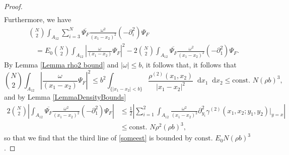 \documentclass[a4paper,11pt]{article}
\newcommand{\abs}[1]{\left\lvert #1 \right\rvert}
\newcommand*\diff{\mathop{}\!\mathrm{d}}
\numberwithin{equation}{section}
\begin{document}
\begin{proof}
\begin{equation}
\begin{aligned}
		\end{aligned}
		\end{equation}
		Furthermore, we have \begin{equation}
		\begin{aligned}
		&\binom{N}{2}\int_{A_{12}}\sum_{i=3}^{N} \overline{\Psi_F}\frac{\omega^2}{(x_1-x_2)^2}(-\partial^2_i)\Psi_F\\&\quad=E_0\binom{N}{2}\int_{A_{12}}\left\lvert\frac{\omega}{(x_1-x_2)}\Psi_F\right\rvert^2-2\binom{N}{2}\int_{A_{12}} \overline{\Psi_F}\frac{\omega^2}{(x_1-x_2)^2}(-\partial^2_1)\Psi_F.
		\end{aligned}
		\end{equation}
		By Lemma \ref{Lemma rho2 bound} and $\abs{\omega}\leq b$, it follows that, it follows that
		\begin{equation}
		\binom{N}{2}\int_{A_{12}}\left\lvert\frac{\omega}{(x_1-x_2)}\Psi_F\right\rvert^2\leq b^2\int_{\{\abs{x_1-x_2}<b\}} \frac{\rho^{(2)}(x_1,x_2)}{\abs{x_1-x_2}^2}\diff x_1\diff x_2\leq \text{const. }N(\rho b)^3,
		\end{equation}
		and by Lemma \ref{LemmaDensityBounds} \begin{equation}
		\begin{aligned}
		2\binom{N}{2}\abs{\int_{A_{12}} \overline{\Psi_F}\frac{\omega^2}{(x_1-x_2)^2}(-\partial^2_1)\Psi_F}&\leq\frac12\abs{\sum_{i=1}^{2}\int_{A_{12}}\frac{\omega^2}{(x_1-x_2)^2}\partial^2_{y_i}\gamma^{(2)}(x_1,x_2;y_1,y_2)\Big\rvert_{y=x}}\\&\leq \text{const. } N\rho^2(\rho b)^3,
		\end{aligned}
		\end{equation}
		so that we find that the third line of \eqref{someest} is bounded by $\text{const. }E_0 N(\rho b)^3$.
  

\end{proof}
\end{document}
